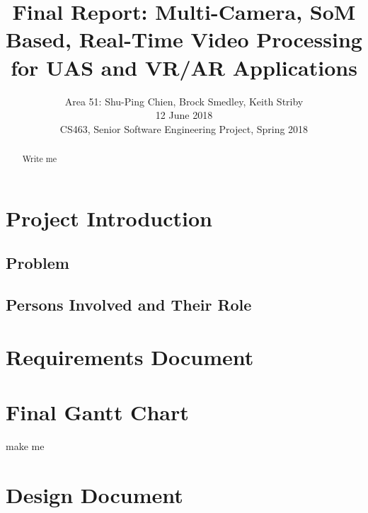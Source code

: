 \documentclass[letterpaper,10pt,serif,draftclsnofoot,onecolumn,compsoc,titlepage]{IEEEtran}
\title{Final Report: Multi-Camera, SoM Based, Real-Time Video Processing for UAS and VR/AR Applications}
\author{Area 51: Shu-Ping Chien, Brock Smedley, Keith Striby \\ 12 June 2018 \\ CS463, Senior Software Engineering Project, Spring 2018}
\begin{document}
\begin{titlepage}
\maketitle

\begin{abstract}

Write me \\


\thispagestyle{empty}
\end{abstract}
\end{titlepage}

\newpage
\tableofcontents

\newpage

\section{Project Introduction}

	\subsection{Problem}


	\subsection{Persons Involved and Their Role}


\newpage

\section{Requirements Document}

	
\newpage

\section{Final Gantt Chart}

	make me\\

\newpage

\section{Design Document}
\end{document}
